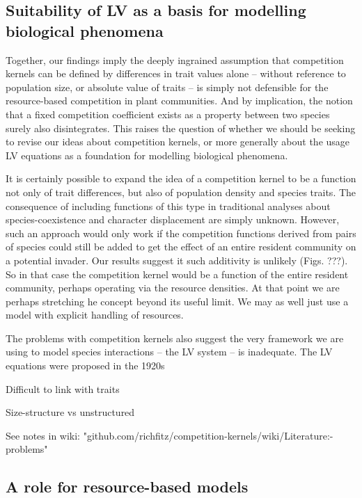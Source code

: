 \documentclass[a4paper,11pt]{article}
\begin{document}
\subsection{Suitability of LV as a basis for modelling biological phenomena}

Together, our findings imply the deeply ingrained assumption that
competition kernels can be defined by differences in trait values
alone -- without reference to population size, or absolute value of traits
-- is simply not defensible for the resource-based competition in plant
communities. And by implication, the notion that a fixed competition
coefficient exists as a property between two species surely also 
disintegrates. This raises the question of whether we should be seeking to
revise our ideas about competition kernels, or more generally about the
usage LV equations as a foundation for modelling biological phenomena.

It is certainly possible to expand the idea of a competition kernel to be a
function not only of trait differences, but also of population density and
species traits. The consequence of including functions of this type in
traditional analyses about species-coexistence and character displacement are
simply unknown. However, such an approach would only work if the competition
functions derived from pairs of species could still be added to get the effect
of an entire resident community on a potential invader. Our results suggest it
such additivity is unlikely (Figs. ???). So in that case the competition
kernel would be a function of the entire resident community, perhaps operating
via the resource densities. At that point we are perhaps stretching he concept
beyond its useful limit. We may as well just use a model with explicit
handling of resources.

The problems with competition kernels also suggest the very framework we are
using to model species interactions -- the LV system -- is inadequate. The
LV equations were proposed in the 1920s \citep{Volterra-1928}


Difficult to link with traits

Size-structure vs unstructured

See notes in wiki:
"github.com/richfitz/competition-kernels/wiki/Literature:-problems"

\subsection{A role for resource-based models}
\end{document}
